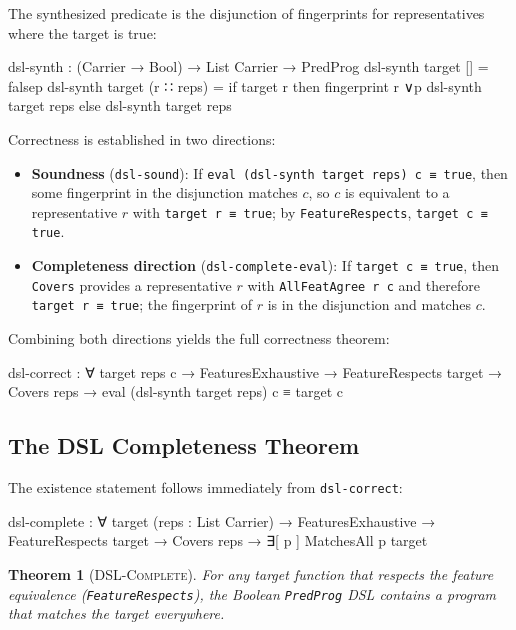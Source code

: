 \documentclass[9pt,a4paper]{article}
\theoremstyle{plain}
\newtheorem{theorem}{Theorem}
\theoremstyle{definition}
\theoremstyle{remark}
\begin{document}
The synthesized predicate is the disjunction of fingerprints for representatives where the target is true:

\begin{spec}
    dsl-synth : (Carrier → Bool) → List Carrier → PredProg
    dsl-synth target []         = falsep
    dsl-synth target (r ∷ reps) =
      if target r then fingerprint r ∨p dsl-synth target reps
                  else dsl-synth target reps
\end{spec}

\noindent Correctness is established in two directions:

\begin{itemize}
\item \textbf{Soundness} (\texttt{dsl-sound}):  If \texttt{eval (dsl-synth target reps) c ≡ true}, then some fingerprint in the disjunction matches $c$, so $c$ is equivalent to a representative $r$ with \texttt{target r ≡ true}; by \texttt{FeatureRespects}, \texttt{target c ≡ true}.
\item \textbf{Completeness direction} (\texttt{dsl-complete-eval}):  If \texttt{target c ≡ true}, then \texttt{Covers} provides a representative $r$ with \texttt{AllFeatAgree r c} and therefore \texttt{target r ≡ true}; the fingerprint of $r$ is in the disjunction and matches $c$.
\end{itemize}

\noindent Combining both directions yields the full correctness theorem:

\begin{spec}
    dsl-correct : ∀ target reps c →
      FeaturesExhaustive → FeatureRespects target → Covers reps →
      eval (dsl-synth target reps) c ≡ target c
\end{spec}

\subsection{The DSL Completeness Theorem}

The existence statement follows immediately from \texttt{dsl-correct}:

\begin{spec}
    dsl-complete : ∀ target (reps : List Carrier) →
      FeaturesExhaustive → FeatureRespects target → Covers reps →
      ∃[ p ] MatchesAll p target
\end{spec}

\begin{theorem}[\textsc{DSL-Complete}]
For any target function that respects the feature equivalence (\texttt{FeatureRespects}), the Boolean \texttt{PredProg} DSL contains a program that matches the target everywhere.
\end{theorem}
\end{document}
